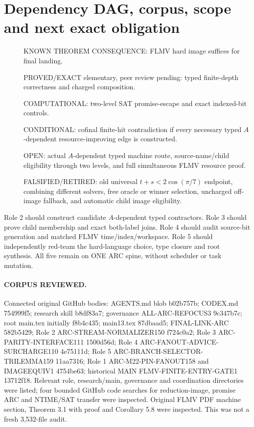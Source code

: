\documentclass[11pt]{article}
\begin{document}
\section{Dependency DAG, corpus, scope and next exact obligation}
\begin{description}
\item[] KNOWN THEOREM CONSEQUENCE: FLMV hard image suffices for final landing.
\item[] PROVED/EXACT elementary, peer review pending: typed finite-depth
correctness and charged composition.
\item[] COMPUTATIONAL: two-level SAT promise-escape and exact indexed-bit controls.
\item[] CONDITIONAL: cofinal finite-hit contradiction if every necessary
typed $A$-dependent resource-improving edge is constructed.
\item[] OPEN: actual $A$-dependent typed machine route, source-name/child
eligibility through two levels, and full simultaneous FLMV resource proof.
\item[] FALSIFIED/RETIRED: old universal
$t+s<2\cos(\pi/7)$ endpoint, combining different solvers, free oracle or
winner selection, uncharged off-image fallback, and automatic child
image eligibility.
\end{description}
Role 2 should construct candidate $A$-dependent typed contractors.
Role 3 should prove child membership and exact both-label joins.
Role 4 should audit source-bit generation and matched FLMV
time/index/workspace. Role 5 should independently red-team the
hard-language choice, type closure and root synthesis.
All five remain on ONE ARC spine, without scheduler or task mutation.

\paragraph{CORPUS REVIEWED.}
Connected original GitHub bodies: AGENTS.md blob b02b757b;
CODEX.md 754999f5; research skill b8df83a7; governance
ALL-ARC-REFOCUS3 9c347b7c; root main.tex initially f8b4c435;
main13.tex 87dbaad5; FINAL-LINK-ARC 582b5429;
Role 2 ARC-STREAM-NORMALIZER150 f724c0a2;
Role 3 ARC-PARITY-INTERFACE111 1500d56d;
Role 4 ARC-FANOUT-ADVICE-SURCHARGE110 4e75111d;
Role 5 ARC-BRANCH-SELECTOR-TRILEMMA159 11aa7316;
Role 1 ARC-M22-PIN-FANOUT158 and IMAGEEQUIV1 4754be63;
historical MAIN FLMV-FINITE-ENTRY-GATE1 13712f18.
Relevant role, research/main, governance and coordination directories
were listed; four bounded GitHub code searches for reduction-image,
promise ARC and NTIME/SAT transfer were inspected. Original FLMV PDF
machine section, Theorem 3.1 with proof and Corollary 5.8 were inspected.
This was not a fresh 3,532-file audit.
\end{document}

